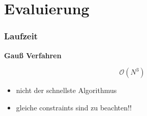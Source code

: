 \section{Evaluierung}

\begin{frame}
    \frametitle{Laufzeit}

    \textbf{Gauß Verfahren}

    $$ \mathcal{O}( N^3 ) $$

    \begin{itemize}
        \item nicht der schnellste Algorithmus
        \item gleiche constraints sind zu beachten!! 
    \end{itemize}

\end{frame}


